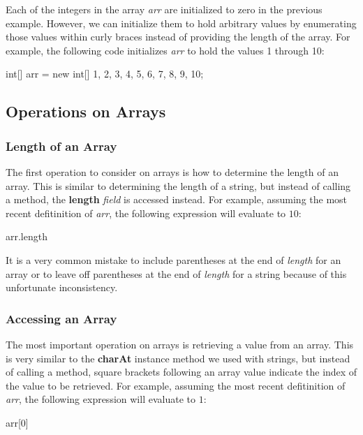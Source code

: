 Each of the integers in the array \textit{arr} are initialized to zero in the previous example. However, we can initialize them to hold arbitrary values by enumerating those values within curly braces instead of providing the length of the array. For example, the following code initializes \textit{arr} to hold the values 1 through 10:


\begin{code}
int[] arr = new int[] {1, 2, 3, 4, 5, 6, 7, 8, 9, 10};
\end{code}

\subsection{Operations on Arrays}

\subsubsection{Length of an Array}
The first operation to consider on arrays is how to determine the length of an array. This is similar to determining the length of a string, but instead of calling a method, the \textbf{length} \textit{field} is accessed instead. For example, assuming the most recent defitinition of \textit{arr}, the following expression will evaluate to $10$:

\begin{code}
arr.length
\end{code}

It is a very common mistake to include parentheses at the end of \textit{length} for an array or to leave off parentheses at the end of \textit{length} for a string because of this unfortunate inconsistency. 

\subsubsection{Accessing an Array}

The most important operation on arrays is retrieving a value from an array. This is very similar to the \textbf{charAt} instance method we used with strings, but instead of calling a method, square brackets following an array value indicate the index of the value to be retrieved. For example, assuming the most recent defitinition of \textit{arr}, the following expression will evaluate to $1$:

\begin{code}
arr[0]
\end{code}

